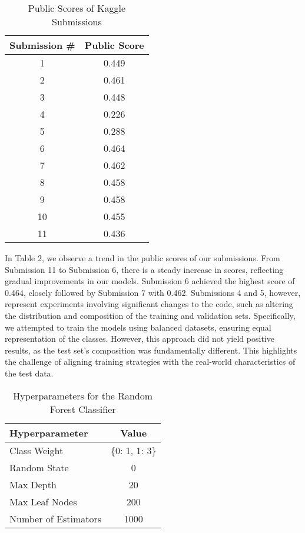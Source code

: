 \documentclass{article} %
\begin{document}
\begin{table}[ht!]
   \centering
   \begin{tabular}{|c|c|}
       \hline
       \textbf{Submission \#} & \textbf{Public Score} \\ \hline
       1 & 0.449 \\ \hline
       2 & 0.461 \\ \hline
       3 & 0.448 \\ \hline
       4 & 0.226 \\ \hline
       5 & 0.288 \\ \hline
       6 & 0.464 \\ \hline
       7 & 0.462 \\ \hline
       8 & 0.458 \\ \hline
       9 & 0.458 \\ \hline
       10 & 0.455 \\ \hline
       11 & 0.436 \\ \hline
   \end{tabular}
   \caption{Public Scores of Kaggle Submissions}
   \label{tab:kaggle-scores}
\end{table}


In Table 2, we observe a trend in the public scores of our submissions. From Submission 11 to Submission 6, there is a steady increase in scores, reflecting gradual improvements in our models. Submission 6 achieved the highest score of 0.464, closely followed by Submission 7 with 0.462. Submissions 4 and 5, however, represent experiments involving significant changes to the code, such as altering the distribution and composition of the training and validation sets. Specifically, we attempted to train the models using balanced datasets, ensuring equal representation of the classes. However, this approach did not yield positive results, as the test set's composition was fundamentally different. This highlights the challenge of aligning training strategies with the real-world characteristics of the test data.

\begin{table}[ht!]
   \centering
   \begin{tabular}{|l|c|}
       \hline
       \textbf{Hyperparameter} & \textbf{Value} \\ \hline
       Class Weight & \{0: 1, 1: 3\} \\ \hline
       Random State & 0 \\ \hline
       Max Depth & 20 \\ \hline
       Max Leaf Nodes & 200 \\ \hline
       Number of Estimators & 1000 \\ \hline
   \end{tabular}
   \caption{Hyperparameters for the Random Forest Classifier}
   \label{tab:random-forest-hyperparameters}
\end{table}
\end{document}
